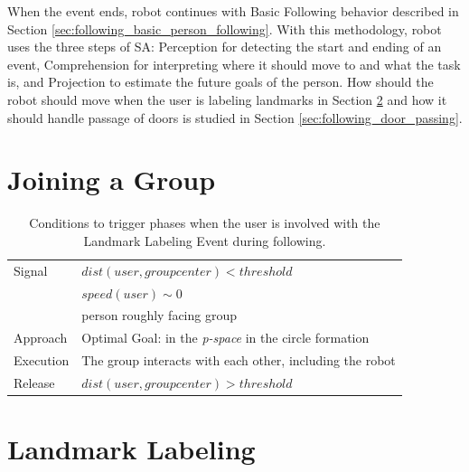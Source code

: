 When the event ends, robot continues with Basic Following behavior described in Section \ref{sec:following_basic_person_following}. With this methodology, robot uses the three steps of SA: Perception for detecting the start and ending of an event, Comprehension for interpreting where it should move to and what the task is, and Projection to estimate the future goals of the person. How should the robot should move when the user is labeling landmarks in Section \ref{sec:following_landmark_labeling} and how it should handle passage of doors is studied in Section \ref{sec:following_door_passing}.



\section{Joining a Group}
\label{sec:following_joining_group}

\begin{table}[ht!]
	\centering
  \begin{tabular}{l |  m{10cm}}    
    \toprule    
    Signal & {$dist(user, groupcenter)<threshold$}\\       
	                           & {$speed(user)\sim 0$} \\
	                           & {person roughly facing group}\\ \midrule		                           		                                
    Approach & {Optimal Goal: in the \textit{p-space} in the circle formation}\\       \midrule
    Execution & {The group interacts with each other, including the robot}\\  \midrule
    Release & {$dist(user, groupcenter)>threshold$}\\ 
    \bottomrule
  \end{tabular}
      \caption{Conditions to trigger phases when the user is involved with the Landmark Labeling Event during following.}
    \label{table:situation_aware_list_group}
\end{table}


\section{Landmark Labeling}
\label{sec:following_landmark_labeling}

